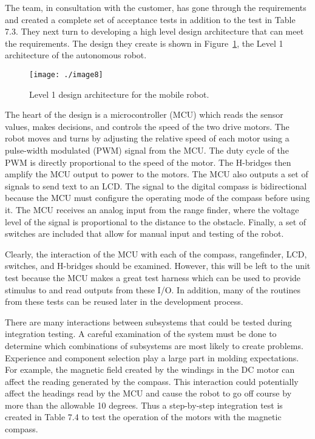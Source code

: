 {The team, in consultation with the customer, has gone through the
requirements and created a complete set of acceptance tests in addition
to the test in Table 7.3. They next turn to developing a high level
design architecture that can meet the requirements. The design they
create is shown in 
Figure~\ref{figure:level1mobileRobot}, the Level 1 architecture of the
autonomous robot.


\begin{figure}
\texttt{[image: ./image8]}
\caption{Level 1 design architecture for the mobile robot.}
\label{figure:level1mobileRobot}
\end{figure}

The heart of the design is a microcontroller (MCU) which reads the
sensor values, makes decisions, and controls the speed of the two drive
motors. The robot moves and turns by adjusting the relative speed of
each motor using a pulse-width modulated (PWM) signal from the MCU. The
duty cycle of the PWM is directly proportional to the speed of the
motor. The H-bridges then amplify the MCU output to power to the motors.
The MCU also outputs a set of signals to send text to an LCD. The signal
to the digital compass is bidirectional because the MCU must configure
the operating mode of the compass before using it. The MCU receives an
analog input from the range finder, where the voltage level of the
signal is proportional to the distance to the obstacle. Finally, a set
of switches are included that allow for manual input and testing of the
robot.

Clearly, the interaction of the MCU with each of the compass,
rangefinder, LCD, switches, and H-bridges should be examined. However,
this will be left to the unit test because the MCU makes a great test
harness which can be used to provide stimulus to and read outputs from
these I/O. In addition, many of the routines from these tests can be
reused later in the development process.

There are many interactions between subsystems that could be tested
during integration testing. A careful examination of the system must be
done to determine which combinations of subsystems are most likely to
create problems. Experience and component selection play a large part in
molding expectations. For example, the magnetic field created by the
windings in the DC motor can affect the reading generated by the
compass. This interaction could potentially affect the headings read by
the MCU and cause the robot to go off course by more than the allowable
10 degrees. Thus a step-by-step integration test is created in Table 7.4
to test the operation of the motors with the magnetic compass.

}
